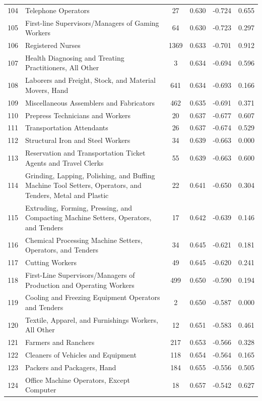 {\begin{longtable}{llcccc}
 104 & Telephone Operators & 27 & 0.630 & -0.724 & 0.655 \\
 105 & First-line Supervisors/Managers of Gaming Workers & 64 & 0.630 & -0.723 & 0.297 \\
 106 & Registered Nurses & 1369 & 0.633 & -0.701 & 0.912 \\
 107 & Health Diagnosing and Treating Practitioners, All Other & 3 & 0.634 & -0.694 & 0.596 \\
 108 & Laborers and Freight, Stock, and Material Movers, Hand & 641 & 0.634 & -0.693 & 0.166 \\
 109 & Miscellaneous Assemblers and Fabricators & 462 & 0.635 & -0.691 & 0.371 \\
 110 & Prepress Technicians and Workers & 20 & 0.637 & -0.677 & 0.607 \\
 111 & Transportation Attendants & 26 & 0.637 & -0.674 & 0.529 \\
 112 & Structural Iron and Steel Workers & 34 & 0.639 & -0.663 & 0.000 \\
 113 & Reservation and Transportation Ticket Agents and Travel Clerks & 55 & 0.639 & -0.663 & 0.600 \\
 114 & Grinding, Lapping, Polishing, and Buffing Machine Tool Setters, Operators, and Tenders, Metal and Plastic & 22 & 0.641 & -0.650 & 0.304 \\
 115 & Extruding, Forming, Pressing, and Compacting Machine Setters, Operators, and Tenders & 17 & 0.642 & -0.639 & 0.146 \\
 116 & Chemical Processing Machine Setters, Operators, and Tenders & 34 & 0.645 & -0.621 & 0.181 \\
 117 & Cutting Workers & 49 & 0.645 & -0.620 & 0.241 \\
 118 & First-Line Supervisors/Managers of Production and Operating Workers & 499 & 0.650 & -0.590 & 0.194 \\
 119 & Cooling and Freezing Equipment Operators and Tenders & 2 & 0.650 & -0.587 & 0.000 \\
 120 & Textile, Apparel, and Furnishings Workers, All Other & 12 & 0.651 & -0.583 & 0.461 \\
 121 & Farmers and Ranchers & 217 & 0.653 & -0.566 & 0.328 \\
 122 & Cleaners of Vehicles and Equipment & 118 & 0.654 & -0.564 & 0.165 \\
 123 & Packers and Packagers, Hand & 184 & 0.655 & -0.556 & 0.505 \\
 124 & Office Machine Operators, Except Computer & 18 & 0.657 & -0.542 & 0.627 \\

\end{longtable}}
